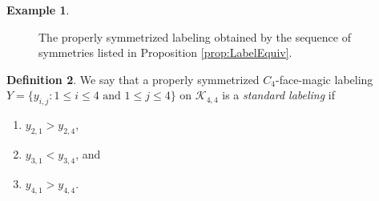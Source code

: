 \documentclass[10pt, reqno]{amsart}
\theoremstyle{definition}
\newtheorem{definition}{Definition}
\newtheorem{example}[definition]{Example}
\theoremstyle{plain}
\begin{document}
\begin{example}
\begin{figure}[hbt!]

\caption{The properly symmetrized labeling obtained
by the sequence of symmetries listed in 
Proposition \ref{prop:LabelEquiv}.}
\label{fig:properlysymmetrized}
\end{figure}
\end{example}



\begin{definition}\label{defn:StandardLabel}
    We say that a properly symmetrized
    $C_4$-face-magic labeling\\
     $Y=\{y_{i,j}: 1\le i \le 4 \text{ and } 
   1\le j \le 4\}$ on  $\mathcal{K}_{4,4}$
   is a \textit{standard labeling} if
   \begin{enumerate}
       \item $y_{2,1} > y_{2,4}$,
       \item $y_{3,1} < y_{3,4}$, and
       \item $y_{4,1} > y_{4,4}$.
   \end{enumerate}
\end{definition}
\end{document}
